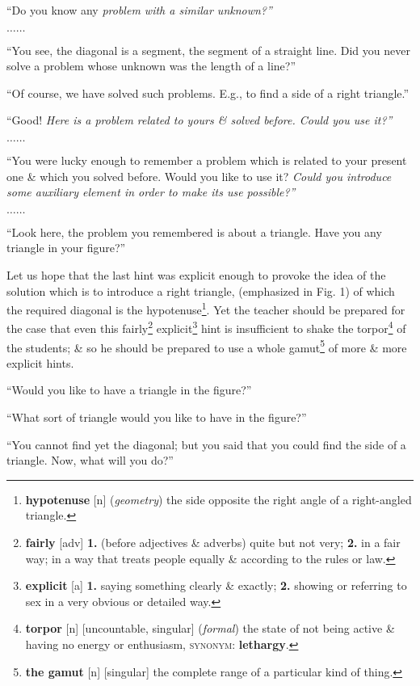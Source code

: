 \documentclass[oneside]{book}
\numberwithin{equation}{section}
\begin{document}
``Do you know any \textit{problem with a similar unknown?''}

$\ldots\ldots$

``You see, the diagonal is a segment, the segment of a straight line. Did you never solve a problem whose unknown was the length of a line?''

``Of course, we have solved such problems. E.g., to find a side of a right triangle.''

``Good! \textit{Here is a problem related to yours \& solved before. Could you use it?''}

$\ldots\ldots$

``You were lucky enough to remember a problem which is related to your present one \& which you solved before. Would you like to use it? \textit{Could you introduce some auxiliary element in order to make its use possible?''}

$\ldots\ldots$

``Look here, the problem you remembered is about a triangle. Have you any triangle in your figure?''

Let us hope that the last hint was explicit enough to provoke the idea of the solution which is to introduce a right triangle, (emphasized in Fig. 1) of which the required diagonal is the hypotenuse\footnote{\textbf{hypotenuse} [n] (\textit{geometry}) the side opposite the right angle of a right-angled triangle.}. Yet the teacher should be prepared for the case that even this fairly\footnote{\textbf{fairly} [adv] \textbf{1.} (before adjectives \& adverbs) quite but not very; \textbf{2.} in a fair way; in a way that treats people equally \& according to the rules or law.} explicit\footnote{\textbf{explicit} [a] \textbf{1.} saying something clearly \& exactly; \textbf{2.} showing or referring to sex in a very obvious or detailed way.} hint is insufficient to shake the torpor\footnote{\textbf{torpor} [n] [uncountable, singular] (\textit{formal}) the state of not being active \& having no energy or enthusiasm, \textsc{synonym}: \textbf{lethargy}.} of the students; \& so he should be prepared to use a whole gamut\footnote{\textbf{the gamut} [n] [singular] the complete range of a particular kind of thing.} of more \& more explicit hints.

``Would you like to have a triangle in the figure?''

``What sort of triangle would you like to have in the figure?''

``You cannot find yet the diagonal; but you said that you could find the side of a triangle. Now, what will you do?''
\end{document}
